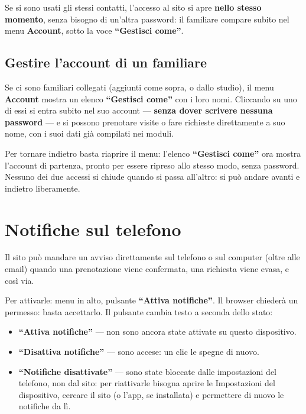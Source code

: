 \documentclass[11pt,a4paper]{article}
\newcommand{\schermata}[1]{\textbf{\color{studioteal}#1}}
\newcommand{\bottone}[1]{\textbf{``#1''}}
\begin{document}
Se si sono usati gli stessi contatti, l'accesso al sito si apre \textbf{nello stesso momento}, senza bisogno di un'altra password: il familiare compare subito nel menu \schermata{Account}, sotto la voce \bottone{Gestisci come}.

\subsection{Gestire l'account di un familiare}

Se ci sono familiari collegati (aggiunti come sopra, o dallo studio), il menu \schermata{Account} mostra un elenco \bottone{Gestisci come} con i loro nomi. Cliccando su uno di essi si entra subito nel suo account --- \textbf{senza dover scrivere nessuna password} --- e si possono prenotare visite o fare richieste direttamente a suo nome, con i suoi dati già compilati nei moduli.

Per tornare indietro basta riaprire il menu: l'elenco \bottone{Gestisci come} ora mostra l'account di partenza, pronto per essere ripreso allo stesso modo, senza password. Nessuno dei due accessi si chiude quando si passa all'altro: si può andare avanti e indietro liberamente.

\section{Notifiche sul telefono}

Il sito può mandare un avviso direttamente sul telefono o sul computer (oltre alle email) quando una prenotazione viene confermata, una richiesta viene evasa, e così via.

Per attivarle: menu in alto, pulsante \bottone{Attiva notifiche}. Il browser chiederà un permesso: basta accettarlo. Il pulsante cambia testo a seconda dello stato:

\begin{itemize}
  \item \bottone{Attiva notifiche} --- non sono ancora state attivate su questo dispositivo.
  \item \bottone{Disattiva notifiche} --- sono accese: un clic le spegne di nuovo.
  \item \bottone{Notifiche disattivate} --- sono state bloccate dalle impostazioni del telefono, non dal sito: per riattivarle bisogna aprire le Impostazioni del dispositivo, cercare il sito (o l'app, se installata) e permettere di nuovo le notifiche da lì.
\end{itemize}
\end{document}
